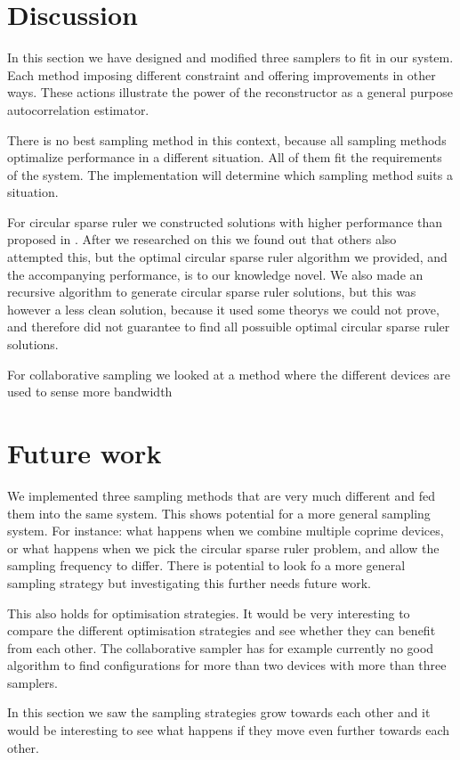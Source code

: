 \documentclass[a4paper, openany, oneside]{memoir}
\begin{document}
\section{Discussion}
In this section we have designed and modified three samplers to fit in our system. Each method imposing different constraint and offering improvements in other ways. These actions illustrate the power of the reconstructor as a general purpose autocorrelation estimator. 

There is no best sampling method in this context, because all sampling methods optimalize performance in a different situation. All of them fit the requirements of the system. The implementation will determine which sampling method suits a situation.

For circular sparse ruler we constructed solutions with higher performance than proposed in \cite{ariananda2012compressive}. After we researched on this we found out that others also attempted  this, but the optimal circular sparse ruler algorithm we provided, and the accompanying performance, is to our knowledge novel. We also made an recursive algorithm to generate circular sparse ruler solutions,  but this was however a less clean solution, because it used some theorys we could not prove, and therefore did not guarantee to find all possuible optimal circular sparse ruler solutions.

For collaborative sampling we looked at a method where the different devices are used to sense more bandwidth

\section{Future work}
We implemented three sampling methods that are very much different and fed them into the same system. This shows potential for a more general sampling system. For instance: what happens when we combine multiple coprime devices, or what happens when we pick the circular sparse ruler problem, and allow the sampling frequency to differ. There is potential to look fo a more general sampling strategy but investigating this further needs future work.

This also holds for optimisation strategies. It would be very interesting to compare the different optimisation strategies and see whether they can benefit from each other. The collaborative sampler has for example currently no good algorithm to find configurations for more than two devices with more than three samplers. 

In this section we saw the sampling strategies grow towards each other and it would be interesting to see what happens if they move even further towards each other. 
\end{document}
